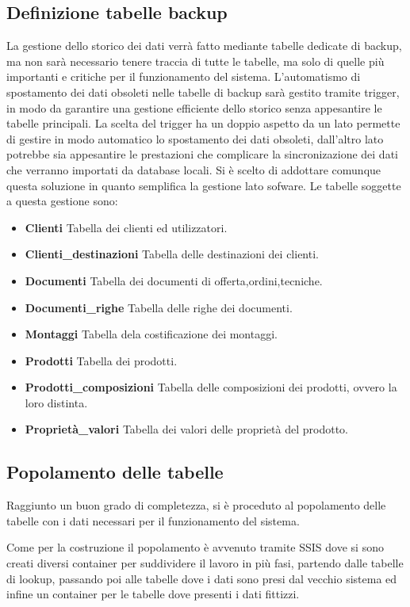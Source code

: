 \documentclass[12pt, a4paper]{article}
\begin{document}
\subsection{Definizione tabelle backup}
La gestione dello storico dei dati verrà fatto mediante tabelle dedicate di backup, ma non sarà necessario tenere traccia di tutte le tabelle,
ma solo di quelle più importanti e critiche per il funzionamento del sistema.
L'automatismo di spostamento dei dati obsoleti nelle tabelle di backup sarà gestito tramite trigger,
in modo da garantire una gestione efficiente dello storico senza appesantire le tabelle principali.
La scelta del trigger ha un doppio aspetto da un lato permette di gestire in modo automatico lo spostamento dei dati obsoleti,
dall'altro lato potrebbe sia appesantire le prestazioni che complicare la sincronizazione dei dati che verranno importati da database locali.
Si è scelto di addottare comunque questa soluzione in quanto semplifica la gestione lato sofware.
Le tabelle soggette a questa gestione sono:
\begin{itemize}
    \item \textbf{Clienti} Tabella dei clienti ed utilizzatori.
    \item \textbf{Clienti\_destinazioni} Tabella delle destinazioni dei clienti.
    \item \textbf{Documenti} Tabella dei documenti di offerta,ordini,tecniche.
    \item \textbf{Documenti\_righe} Tabella delle righe dei documenti.
    \item \textbf{Montaggi} Tabella dela costificazione dei montaggi.
    \item \textbf{Prodotti} Tabella dei prodotti.
    \item \textbf{Prodotti\_composizioni} Tabella delle composizioni dei prodotti, ovvero la loro distinta.
    \item \textbf{Proprietà\_valori} Tabella dei valori delle proprietà del prodotto.
\end{itemize}

\subsection{Popolamento delle tabelle}
Raggiunto un buon grado di completezza, si è proceduto al popolamento delle tabelle con i dati necessari per il funzionamento del sistema.

Come per la costruzione il popolamento è avvenuto tramite SSIS dove si sono creati diversi container per suddividere il lavoro in più fasi,
partendo dalle tabelle di lookup, passando poi alle tabelle dove i dati sono presi dal vecchio sistema ed infine un container per le tabelle dove presenti i dati fittizzi.
\end{document}
